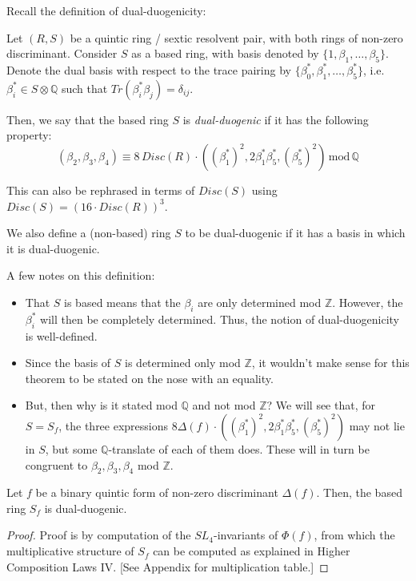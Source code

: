 \documentclass{article}
\begin{document}
Recall the definition of dual-duogenicity:
\begin{definition} \label{dual duogenic2}
Let $(R,S)$ be a quintic ring / sextic resolvent pair, with both rings of non-zero discriminant.  Consider $S$ as a based ring, with basis denoted by $\{1,\beta_1,\ldots,\beta_5\}$.  Denote the dual basis with respect to the trace pairing by $\{\beta_0^*,\beta_1^*,\ldots,\beta_5^*\}$, i.e. $\beta_i^* \in S \otimes \mathbb{Q}$ such that $Tr(\beta_i^* \beta_j) = \delta_{ij}$.

Then, we say that the based ring $S$ is \emph{dual-duogenic} if it has the following property:
\begin{equation}
(\beta_2,\beta_3,\beta_4) \equiv 8 \, Disc(R) \cdot ( (\beta_1^*)^2, 2 \beta_1^* \beta_5^*, (\beta_5^*)^2 ) \, \text{mod} \, \mathbb{Q}
\end{equation}

This can also be rephrased in terms of $Disc(S)$ using $Disc(S) = (16 \cdot Disc(R))^3$.

We also define a (non-based) ring $S$ to be dual-duogenic if it has a basis in which it is dual-duogenic.
\end{definition}

A few notes on this definition:
\begin{itemize}
\item That $S$ is based means that the $\beta_i$ are only determined mod $\mathbb{Z}$.  However, the $\beta_i^*$ will then be completely determined.  Thus, the notion of dual-duogenicity is well-defined.
\item Since the basis of $S$ is determined only mod $\mathbb{Z}$, it wouldn't make sense for this theorem to be stated on the nose with an equality.
\item But, then why is it stated mod $\mathbb{Q}$ and not mod $\mathbb{Z}$?  We will see that, for $S = S_f$, the three expressions $8 \Delta(f) \cdot ((\beta_1^*)^2, 2 \beta_1^* \beta_5^*, (\beta_5^*)^2)$ may not lie in $S$, but some $\mathbb{Q}$-translate of each of them does.  These will in turn be congruent to $\beta_2, \beta_3, \beta_4$ mod $\mathbb{Z}$.
\end{itemize}


\begin{theorem} \label{sextic structure2}
Let $f$ be a binary quintic form of non-zero discriminant $\Delta(f)$.  Then, the based ring $S_f$ is dual-duogenic.
\end{theorem}
\begin{proof}
Proof is by computation of the $SL_4$-invariants of $\Phi(f)$, from which the multiplicative structure of $S_f$ can be computed as explained in Higher Composition Laws IV.  [See Appendix for multiplication table.]
\end{proof}
\end{document}
